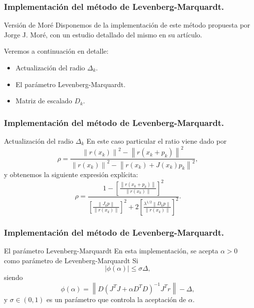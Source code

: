 \documentclass{beamer}
\newcommand{\norm}[1]{\left\lVert#1\right\rVert}
\begin{document}
\begin{frame}
    \frametitle{Implementación del método de Levenberg-Marquardt.}
    \begin{block}{Versión de Moré}
        Disponemos de la implementación de este método propuesta por Jorge J. Moré,
        con un estudio detallado del mismo en su artículo.
    \end{block} \pause
    \begin{block}{Veremos a continuación en detalle:}
        \begin{itemize}[label=\textbullet]
            \item Actualización del radio $\Delta_k$. \pause
            \item El parámetro Levenberg-Marquardt. \pause
            \item Matriz de escalado $D_k$.
        \end{itemize}
    \end{block}
\end{frame}

\begin{frame}
    \frametitle{Implementación del método de Levenberg-Marquardt.}
    \begin{block}{Actualización del radio $\Delta_k$}
        En este caso particular el ratio viene dado por
        \begin{equation*}
	        \rho = \frac{\norm{r(x_k)}^2-\norm{r(x_k+p_k)}^2}{\norm{r(x_k)}^2-\norm{r(x_k)+J(x_k)p_k}^2},
        \end{equation*}
        y obtenemos la siguiente expresión explícita:
        \begin{equation*}
            \rho = \frac{1-\left[\frac{\norm{r(x_k+p_k)}}{\norm{r(x_k)}}\right]^2}
                        {\left[\frac{\norm{J_kp}}{\norm{r(x_k)}}\right]^2
                        + 2\left[\frac{\lambda^{1/2}\norm{D_kp}}{\norm{r(x_k)}}\right]^2}.
        \end{equation*}
    \end{block}
\end{frame}

\begin{frame}
    \frametitle{Implementación del método de Levenberg-Marquardt.}
    \begin{block}{El parámetro Levenberg-Marquardt}
        En esta implementación, se acepta $\alpha>0$ como parámetro de Levenberg-Marquardt Si
        \begin{equation*}
            |\phi(\alpha)| \leq \sigma\Delta,
        \end{equation*}
        siendo
        \begin{equation*}
            \phi(\alpha) = \norm{D(J^TJ+\alpha D^TD)^{-1}J^Tr}-\Delta,
        \end{equation*}
        y $\sigma \in (0,1)$ es un parámetro que controla la aceptación de $\alpha$. 
    \end{block}
\end{frame}
\end{document}
